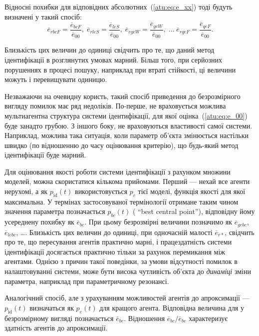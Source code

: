 Відносні похибки для відповідних абсолютних~(\ref{atu:eq:e_xx})
тоді будуть визначені у такий спосіб:
%
\begin{equation}
  \overline{e}_{rbcF} = \frac{\overline{e}_{bcF}}{\overline{e}_{00}}, \;
  \overline{e}_{rleS} = \frac{\overline{e}_{leS}}{\overline{e}_{00}}, \;
  \overline{e}_{rgeW} = \frac{\overline{e}_{geW}}{\overline{e}_{00}},
  \; \ldots \;
  \overline{e}_{rqeF} = \frac{\overline{e}_{qeF}}{\overline{e}_{00}}.
  \label{atu:eq:e_rxx}
\end{equation}

Близькість цих величин до одиниці свідчить про те, що даний метод ідентифікації
в розглянутих умовах марний. Більш того, при серйозних порушеннях в процесі
пошуку, наприклад при втраті стійкості, ці величини можуть і перевищувати
одиницю.

Незважаючи на очевидну користь, такий спосіб приведення до
безрозмірного вигляду помилок має ряд недоліків. По-перше,
не враховується можлива мультиагентна структура системи
ідентифікації, для якої оцінка~(\ref{atu:eq:e_00}) буде занадто
грубою. З іншого боку, не враховуються властивості самої
системи. Наприклад, можлива така ситуація, коли параметр об'єкта
змінюється настільки швидко (по відношенню до часу оцінювання
критерію), що будь-який метод ідентифікації буде марний.

Для оцінювання якості роботи системи ідентифікації з рахунком
множини моделей, можна скористатися кількома прийомами. Перший
--- нехай все агенти нерухомі, а як
$ p_\mathrm{id}(t) $ використовується
$ p_c $ тієї моделі, функція якості для якої максимальна. У термінах
застосовуваної термінології отримане таким чином значення
параметра позначається
$ p_{bc} (t) $ ( ``best central point''), відповідну йому усереднену похибку як
$ \overline{e}_{bc} $. При цьому безрозмірні величини позначимо як
$ \overline{e}_{gebc} $,
$ \overline{e}_{lebc} $, \ldots. Близькість цих величин до одиниці, при
одночасній малості
$ \overline{e}_{r *} $, свідчить про те, що пересування агентів практично
марні, і працездатність системи ідентифікації досягається
практично тільки за рахунок перемикання між агентами. Однією
з причин такої поведінки, за умови відсутності помилок в
налаштовуванні системи, може бути висока чутливість об'єкта до
\textit{динаміці} зміни параметра, наприклад при параметричному
резонансі.

Аналогічний спосіб, але з урахуванням можливостей агентів до
апроксимації ---
$ p_\mathrm{id} (t) $ визначаться як
$ p_e(t)$ для кращого агента. Відповідна величина для
у безрозмірному вигляді позначається
$ \overline{e}_{be} $. Відношення
$ \overline{e}_{bc} / \overline{e}_{be} $ характеризує здатність
агентів до апроксимації.


